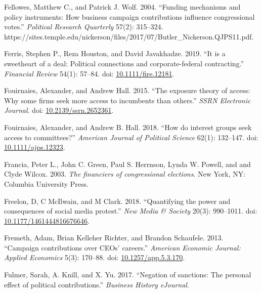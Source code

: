 \documentclass[12pt,]{article}
\newlength{\cslhangindent}
\newenvironment{CSLReferences}[2]%
    {\setlength{\parindent}{0pt}%
    \everypar{\setlength{\hangindent}{\cslhangindent}}\ignorespaces}%
    {\par}
\begin{document}
\begin{CSLReferences}{1}{0}
\leavevmode{}%
Fellowes, Matthew C., and Patrick J. Wolf. 2004. {``Funding mechanisms
and policy instruments: How business campaign contributions influence
congressional votes.''} \emph{Political Research Quarterly} 57(2):
315--324.
https://sites.temple.edu/nickerson/files/2017/07/Butler\_Nickerson.QJPS11.pdf.

\leavevmode{}%
Ferris, Stephen P., Reza Houston, and David Javakhadze. 2019. {``It is a
sweetheart of a deal: Political connections and corporate-federal
contracting.''} \emph{Financial Review} 54(1): 57--84. doi:
\href{https://doi.org/10.1111/fire.12181}{10.1111/fire.12181}.

\leavevmode{}%
Fouirnaies, Alexander, and Andrew Hall. 2015. {``The exposure theory of
access: Why some firms seek more access to incumbents than others.''}
\emph{SSRN Electronic Journal}. doi:
\href{https://doi.org/10.2139/ssrn.2652361}{10.2139/ssrn.2652361}.

\leavevmode{}%
Fouirnaies, Alexander, and Andrew B. Hall. 2018. {``How do interest
groups seek access to committees?''} \emph{American Journal of Political
Science} 62(1): 132--147. doi:
\href{https://doi.org/10.1111/ajps.12323}{10.1111/ajps.12323}.

\leavevmode{}%
Francia, Peter L., John C. Green, Paul S. Herrnson, Lynda W. Powell, and
and Clyde Wilcox. 2003. \emph{The financiers of congressional
elections}. New York, NY: Columbia University Press.

\leavevmode{}%
Freelon, D, C McIlwain, and M Clark. 2018. {``Quantifying the power and
consequences of social media protest.''} \emph{New Media \& Society}
20(3): 990--1011. doi:
\href{https://doi.org/10.1177/1461444816676646}{10.1177/1461444816676646}.

\leavevmode{}%
Fremeth, Adam, Brian Kelleher Richter, and Brandon Schaufele. 2013.
{``Campaign contributions over CEOs' careers.''} \emph{American Economic
Journal: Applied Economics} 5(3): 170--88. doi:
\href{https://doi.org/10.1257/app.5.3.170}{10.1257/app.5.3.170}.

\leavevmode{}%
Fulmer, Sarah, A. Knill, and X. Yu. 2017. {``Negation of sanctions: The
personal effect of political contributions.''} \emph{Business History
eJournal}.


\end{CSLReferences}
\end{document}
